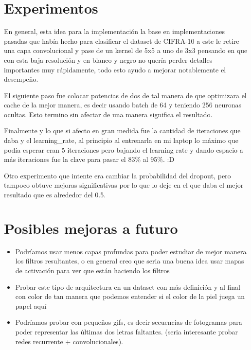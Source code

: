 \documentclass[12pt, fleqn]{report}                             %
\theoremstyle{break}                                            %
\begin{document}
        

        \section{Experimentos}
            En general, esta idea para la implementación la base en implementaciones pasadas que había hecho para clasificar
            el dataset de CIFRA-10 a este le retire una capa convolucional y pase de un kernel de 5x5 a uno de 3x3 pensando en
            que con esta baja resolución y en blanco y negro no quería perder detalles importantes muy rápidamente,
            todo esto ayudo a mejorar notablemente el desempeño.
            
            El siguiente paso fue colocar potencias de dos de tal manera de que optimizara el cache de la mejor manera, es decir
            usando batch de 64 y teniendo 256 neuronas ocultas.
            Esto termino sin afectar de una manera significa el resultado.
            
            Finalmente y lo que si afecto en gran medida fue la cantidad de iteraciones que daba y el learning\_rate, al principio
            al entrenarla en mi laptop lo máximo que podía esperar eran 5 iteraciones pero bajando el learning rate y dando espacio
            a más iteraciones fue la clave para pasar el 83\% al 95\%. :D
            
            Otro experimento que intente era cambiar la probabilidad del dropout, pero tampoco obtuve mejoras significativas por lo
            que lo deje en el que daba el mejor resultado que es alrededor del 0.5.
        \section{Posibles mejoras a futuro}

            \begin{itemize}
                \item Podríamos usar menos capas profundas para poder estudiar de mejor manera los filtros resultantes, o en
                general creo que seria una buena idea usar mapas de activación para ver que están haciendo los filtros
                \item Probar este tipo de arquitectura en un dataset con más definición y al final con color de tan manera que
                podemos entender si el color de la piel juega un papel aquí
                \item Podríamos probar con pequeños gifs, es decir secuencias de fotogramas para poder representar las últimas dos
                letras faltantes. (seria interesante probar redes recurrente + convolucionales).
            \end{itemize}
\end{document}
